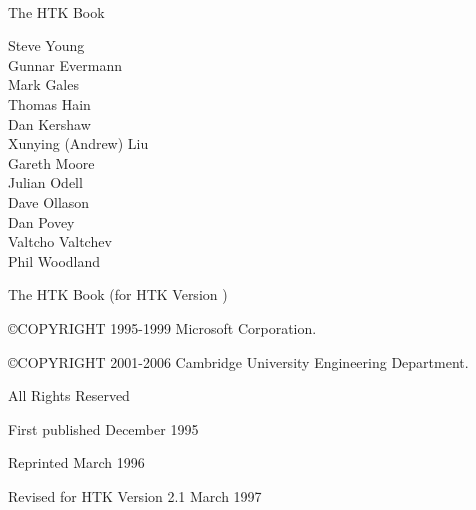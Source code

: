 \documentclass[a4paper,oneside]{book}
\begin{document}
\newlength{\saveindent}
\setlength{\saveindent}{\parindent}



{ \Large \ \\

\vspace{1cm}

\noindent The HTK Book

\vspace{1cm}

\noindent Steve Young \\
\noindent Gunnar Evermann \\
\noindent Mark Gales \\
\noindent Thomas Hain \\
\noindent Dan Kershaw \\
\noindent Xunying (Andrew) Liu \\
\noindent Gareth Moore \\
\noindent Julian Odell \\
\noindent Dave Ollason \\
\noindent Dan Povey \\
\noindent Valtcho Valtchev \\
\noindent Phil Woodland \\

\vspace{0.5cm}

\noindent The HTK Book (for HTK Version \version)

\vspace{1.0cm}

\noindent \copyright COPYRIGHT 1995-1999 Microsoft Corporation. 

\noindent \copyright COPYRIGHT 2001-2006 Cambridge University Engineering Department. 

\vspace{0.2cm}

\noindent All Rights Reserved

\vspace{0,5cm}

\noindent First published December 1995
\vspace{0.1cm}

\noindent Reprinted March 1996 
\vspace{0.1cm}

\noindent Revised for HTK Version 2.1 March 1997 
\vspace{0.1cm}

}
\end{document}
